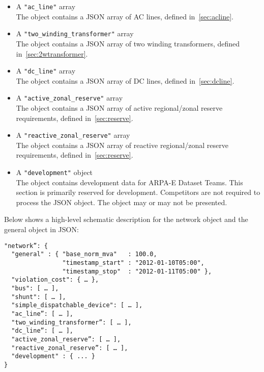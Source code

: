 \begin{itemize}
    \item A \texttt{"ac\_line"} array\\
    The object contains a JSON array of AC lines, defined in~\ref{sec:acline}.
    \item A \texttt{"two\_winding\_transformer"} array\\
    The object contains a JSON array of two winding transformers, defined in~\ref{sec:2wtransformer}.
    \item A \texttt{"dc\_line"} array\\
    The object contains a JSON array of DC lines, defined in~\ref{sec:dcline}.
    \item A \texttt{"active\_zonal\_reserve"} array\\
    The object contains a JSON array of active regional/zonal reserve requirements, defined in~\ref{sec:reserve}.
    \item A \texttt{"reactive\_zonal\_reserve"} array\\
    The object contains a JSON array of reactive regional/zonal reserve requirements, defined in~\ref{sec:reserve}.
    \item A \texttt{"development"} object\\
    The object contains development data for ARPA-E Dataset Teams. This section is primarily reserved for development. Competitors are not required to process the JSON object. The object may or may not be presented. 
\end{itemize}

Below shows a high-level schematic description for the network object and the general object in JSON:
\begin{verbatim}
"network”: {
  "general" : { "base_norm_mva"   : 100.0,
                "timestamp_start" : "2012-01-10T05:00",
                "timestamp_stop"  : "2012-01-11T05:00" },
  "violation_cost": { … },
  "bus": [ … ],
  "shunt": [ … ],
  "simple_dispatchable_device": [ … ],
  "ac_line”: [ … ],
  "two_winding_transformer”: [ … ],
  "dc_line”: [ … ],   
  "active_zonal_reserve”: [ … ],
  "reactive_zonal_reserve”: [ … ],
  "development" : { ... }
}    
\end{verbatim}

